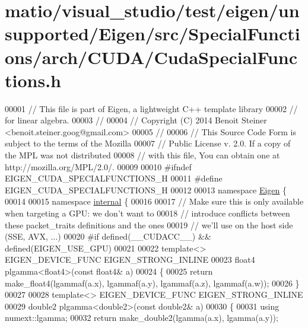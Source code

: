\hypertarget{matio_2visual__studio_2test_2eigen_2unsupported_2_eigen_2src_2_special_functions_2arch_2_c_u_d_a_2_cuda_special_functions_8h_source}{}\section{matio/visual\+\_\+studio/test/eigen/unsupported/\+Eigen/src/\+Special\+Functions/arch/\+C\+U\+D\+A/\+Cuda\+Special\+Functions.h}
\label{matio_2visual__studio_2test_2eigen_2unsupported_2_eigen_2src_2_special_functions_2arch_2_c_u_d_a_2_cuda_special_functions_8h_source}

\begin{DoxyCode}
00001 \textcolor{comment}{// This file is part of Eigen, a lightweight C++ template library}
00002 \textcolor{comment}{// for linear algebra.}
00003 \textcolor{comment}{//}
00004 \textcolor{comment}{// Copyright (C) 2014 Benoit Steiner <benoit.steiner.goog@gmail.com>}
00005 \textcolor{comment}{//}
00006 \textcolor{comment}{// This Source Code Form is subject to the terms of the Mozilla}
00007 \textcolor{comment}{// Public License v. 2.0. If a copy of the MPL was not distributed}
00008 \textcolor{comment}{// with this file, You can obtain one at http://mozilla.org/MPL/2.0/.}
00009 
00010 \textcolor{preprocessor}{#ifndef EIGEN\_CUDA\_SPECIALFUNCTIONS\_H}
00011 \textcolor{preprocessor}{#define EIGEN\_CUDA\_SPECIALFUNCTIONS\_H}
00012 
00013 \textcolor{keyword}{namespace }\hyperlink{namespace_eigen}{Eigen} \{
00014 
00015 \textcolor{keyword}{namespace }\hyperlink{namespaceinternal}{internal} \{
00016 
00017 \textcolor{comment}{// Make sure this is only available when targeting a GPU: we don't want to}
00018 \textcolor{comment}{// introduce conflicts between these packet\_traits definitions and the ones}
00019 \textcolor{comment}{// we'll use on the host side (SSE, AVX, ...)}
00020 \textcolor{preprocessor}{#if defined(\_\_CUDACC\_\_) && defined(EIGEN\_USE\_GPU)}
00021 
00022 \textcolor{keyword}{template}<> EIGEN\_DEVICE\_FUNC EIGEN\_STRONG\_INLINE
00023 float4 plgamma<float4>(\textcolor{keyword}{const} float4& a)
00024 \{
00025   \textcolor{keywordflow}{return} make\_float4(lgammaf(a.x), lgammaf(a.y), lgammaf(a.z), lgammaf(a.w));
00026 \}
00027 
00028 \textcolor{keyword}{template}<> EIGEN\_DEVICE\_FUNC EIGEN\_STRONG\_INLINE
00029 double2 plgamma<double2>(\textcolor{keyword}{const} double2& a)
00030 \{
00031   \textcolor{keyword}{using} numext::lgamma;
00032   \textcolor{keywordflow}{return} make\_double2(lgamma(a.x), lgamma(a.y));

\end{DoxyCode}
